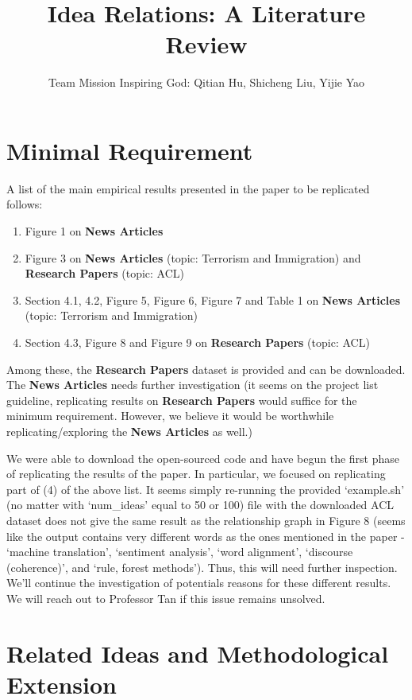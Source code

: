\documentclass{article}
\title{Idea Relations: A Literature Review}
\author{Team Mission Inspiring God: Qitian Hu, Shicheng Liu, Yijie Yao}
\begin{document}
\maketitle 

\section{Minimal Requirement}

A list of the main empirical results presented in the paper to be replicated
\cite{original} follows:

\begin{enumerate}
  \item Figure 1 on \textbf{News Articles}
  \item Figure 3 on \textbf{News Articles} (topic: Terrorism and Immigration)
   and \textbf{Research Papers} (topic: ACL)
  \item Section 4.1, 4.2, Figure 5, Figure 6, Figure 7 and Table 1 on 
  \textbf{News Articles} (topic: Terrorism and Immigration)
  \item Section 4.3, Figure 8 and Figure 9 on \textbf{Research Papers} 
  (topic: ACL)
\end{enumerate}

Among these, the \textbf{Research Papers} dataset is provided and can be downloaded. 
The \textbf{News Articles} needs further investigation (it seems on the 
project list guideline, replicating results on \textbf{Research Papers}
would suffice for the minimum requirement. However, we believe it would be
worthwhile replicating/exploring the \textbf{News Articles} as well.)

We were able to download the open-sourced code and have begun the first phase of replicating
the results of the paper. In particular, we focused on replicating part of (4)
of the above list. It seems simply re-running the provided `example.sh'
(no matter with `num\_ideas' equal to 50 or 100)
file with the downloaded ACL dataset does not give the same result as the
relationship graph in Figure 8 (seems like the output contains very different
words as the ones mentioned in the paper - `machine translation', 
`sentiment analysis', `word alignment', `discourse (coherence)', and 
`rule, forest methods'). Thus, this will need further inspection. We'll continue
the investigation of potentials reasons for these different results. We will reach out to Professor Tan if this issue remains unsolved.

\section{Related Ideas and Methodological Extension}
\end{document}
